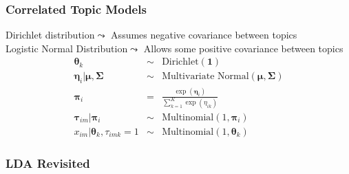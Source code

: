 \documentclass{beamer}
\numberwithin{equation}{section}
\begin{document}
\begin{frame}
\frametitle{Correlated Topic Models}

Dirichlet distribution$\leadsto$ Assumes negative covariance between topics\\
\alert{Logistic Normal Distribution}$\leadsto$ Allows some positive covariance between topics\\

\begin{eqnarray}
\boldsymbol{\theta}_{k} & \sim & \text{Dirichlet}(\boldsymbol{1}) \nonumber \\
\boldsymbol{\eta}_{i}| \boldsymbol{\mu}, \boldsymbol{\Sigma} & \sim & \text{Multivariate Normal}(\boldsymbol{\mu}, \boldsymbol{\Sigma}) \nonumber \\
\boldsymbol{\pi}_{i}  & = & \frac{\exp\left(\boldsymbol{\eta}_{i}\right)}{\sum_{k=1}^{K} \exp\left(\eta_{ik}\right)} \nonumber \\
\boldsymbol{\tau}_{im} | \boldsymbol{\pi}_{i} & \sim & \text{Multinomial}(1, \boldsymbol{\pi}_{i}) \nonumber \\
x_{im} | \boldsymbol{\theta}_{k}, \tau_{imk} = 1 & \sim & \text{Multinomial}(1, \boldsymbol{\theta}_{k}) \nonumber
\end{eqnarray}



\end{frame}




\begin{frame}
\frametitle{LDA Revisited}










\end{frame}
\end{document}
